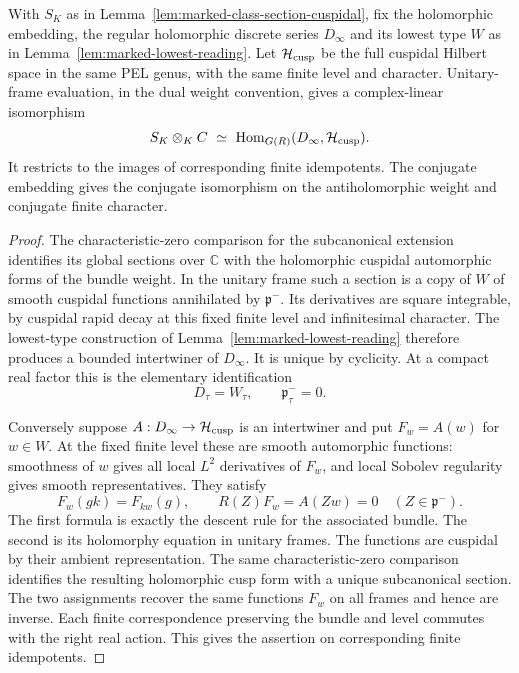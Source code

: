 \begin{auxlemma}
\label{lem:marked-full-holomorphic-row}
With \(S_K\) as in Lemma~\ref{lem:marked-class-section-cuspidal},
fix the holomorphic embedding, the regular holomorphic discrete
series \(D_\infty\) and its lowest type \(W\) as in
Lemma~\ref{lem:marked-lowest-reading}. Let \(\mathcal H_{\rm cusp}\)
be the full cuspidal Hilbert space in the same PEL genus, with the
same finite level and character. Unitary-frame evaluation, in the
dual weight convention, gives a complex-linear isomorphism
\[
 S_K\otimes_{K}\mathbb C
       \ \simeq\
 \operatorname{Hom}_{G(\mathbb R)}
                 (D_\infty,\mathcal H_{\rm cusp}) .
\]
It restricts to the images of corresponding finite idempotents.
The conjugate embedding gives the conjugate isomorphism on the
antiholomorphic weight and conjugate finite character.
\end{auxlemma}
\begin{proof}
The characteristic-zero comparison for the subcanonical extension
identifies its global sections over \(\mathbb C\) with the holomorphic
cuspidal automorphic forms of the bundle weight.
\cite[Section~1, p.~1788]{lan-stroh-subcanonical}
In the unitary frame such a section is a copy of \(W\) of smooth
cuspidal functions annihilated by \(\mathfrak p^-\). Its derivatives
are square integrable, by cuspidal rapid decay at this fixed finite
level and infinitesimal character. The lowest-type construction of
Lemma~\ref{lem:marked-lowest-reading} therefore produces a bounded
intertwiner of \(D_\infty\). It is unique by cyclicity.
At a compact real factor this is the elementary identification
\[
          D_\tau=W_\tau,\qquad \mathfrak p^-_\tau=0 .
\]

Conversely suppose \(A:D_\infty\to\mathcal H_{\rm cusp}\) is an
intertwiner and put \(F_w=A(w)\) for \(w\in W\). At the fixed finite
level these are smooth automorphic functions: smoothness of \(w\)
gives all local \(L^2\) derivatives of \(F_w\), and local Sobolev
regularity gives smooth representatives. They satisfy
\[
 F_w(gk)=F_{kw}(g),\qquad
          R(Z)F_w=A(Zw)=0\quad(Z\in\mathfrak p^-).
\]
The first formula is exactly the descent rule for the associated
bundle. The second is its holomorphy equation in unitary frames.
The functions are cuspidal by their ambient representation.
The same characteristic-zero comparison identifies the resulting
holomorphic cusp form with a unique subcanonical section. The two
assignments recover the same functions \(F_w\) on all frames and
hence are inverse. Each finite correspondence preserving the
bundle and level commutes with the right real action. This gives
the assertion on corresponding finite idempotents.
\end{proof}

